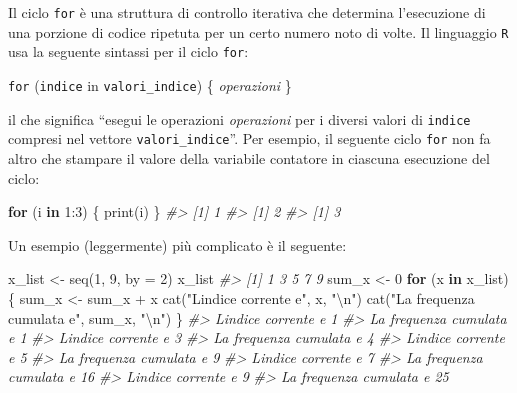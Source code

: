 \documentclass[
  11pt,
]{krantz}
\makeatletter
\newenvironment{Shaded}{\begin{snugshade}}{\end{snugshade}}
\newcommand{\AttributeTok}[1]{\textcolor[rgb]{0.61,0.61,0.61}{#1}}
\newcommand{\CommentTok}[1]{\textcolor[rgb]{0.37,0.37,0.37}{\textit{#1}}}
\newcommand{\ControlFlowTok}[1]{\textcolor[rgb]{0.27,0.27,0.27}{\textbf{#1}}}
\newcommand{\DecValTok}[1]{\textcolor[rgb]{0.06,0.06,0.06}{#1}}
\newcommand{\FunctionTok}[1]{\textcolor[rgb]{0,0,0}{#1}}
\newcommand{\NormalTok}[1]{#1}
\newcommand{\OtherTok}[1]{\textcolor[rgb]{0.37,0.37,0.37}{#1}}
\newcommand{\SpecialCharTok}[1]{\textcolor[rgb]{0,0,0}{#1}}
\newcommand{\StringTok}[1]{\textcolor[rgb]{0.5,0.5,0.5}{#1}}
\newenvironment{kframe}{%
\medskip{}
\setlength{\fboxsep}{.8em}
 \def\at@end@of@kframe{}%
 \ifinner\ifhmode%
  \def\at@end@of@kframe{\end{minipage}}%
  \begin{minipage}{\columnwidth}%
 \fi\fi%
 \def\FrameCommand##1{\hskip\@totalleftmargin \hskip-\fboxsep
 \colorbox{shadecolor}{##1}\hskip-\fboxsep
     \hskip-\linewidth \hskip-\@totalleftmargin \hskip\columnwidth}%
 \MakeFramed {\advance\hsize-\width
   \@totalleftmargin\z@ \linewidth\hsize
   \@setminipage}}%
 {\par\unskip\endMakeFramed%
 \at@end@of@kframe}
\renewenvironment{Shaded}{\begin{kframe}}{\end{kframe}}
\theoremstyle{definition}
\theoremstyle{definition}
\theoremstyle{definition}
\theoremstyle{definition}
\theoremstyle{remark}
\makeatother
\begin{document}
Il ciclo \texttt{for} è una struttura di controllo iterativa che determina l'esecuzione di una porzione di codice ripetuta per un certo numero noto di volte. Il linguaggio \texttt{R} usa la seguente sintassi per il ciclo \texttt{for}:

\texttt{for} (\texttt{indice} in \texttt{valori\_indice}) \{ \emph{operazioni} \}

il che significa ``esegui le operazioni \emph{operazioni} per i diversi valori di \texttt{indice} compresi nel vettore \texttt{valori\_indice}''. Per esempio, il seguente ciclo \texttt{for} non fa altro che stampare il valore della variabile contatore in ciascuna esecuzione del ciclo:

\begin{Shaded}
\begin{Highlighting}[]
\ControlFlowTok{for}\NormalTok{ (i }\ControlFlowTok{in} \DecValTok{1}\SpecialCharTok{:}\DecValTok{3}\NormalTok{) \{}
  \FunctionTok{print}\NormalTok{(i)}
\NormalTok{\}}
\CommentTok{\#\textgreater{} [1] 1}
\CommentTok{\#\textgreater{} [1] 2}
\CommentTok{\#\textgreater{} [1] 3}
\end{Highlighting}
\end{Shaded}

Un esempio (leggermente) più complicato è il seguente:

\begin{Shaded}
\begin{Highlighting}[]
\NormalTok{x\_list }\OtherTok{\textless{}{-}} \FunctionTok{seq}\NormalTok{(}\DecValTok{1}\NormalTok{, }\DecValTok{9}\NormalTok{, }\AttributeTok{by =} \DecValTok{2}\NormalTok{)}
\NormalTok{x\_list}
\CommentTok{\#\textgreater{} [1] 1 3 5 7 9}
\NormalTok{sum\_x }\OtherTok{\textless{}{-}} \DecValTok{0}
\ControlFlowTok{for}\NormalTok{ (x }\ControlFlowTok{in}\NormalTok{ x\_list) \{}
\NormalTok{  sum\_x }\OtherTok{\textless{}{-}}\NormalTok{ sum\_x }\SpecialCharTok{+}\NormalTok{ x}
  \FunctionTok{cat}\NormalTok{(}\StringTok{"L\textquotesingle{}indice corrente e\textquotesingle{}"}\NormalTok{, x, }\StringTok{"}\SpecialCharTok{\textbackslash{}n}\StringTok{"}\NormalTok{)}
  \FunctionTok{cat}\NormalTok{(}\StringTok{"La frequenza cumulata e\textquotesingle{}"}\NormalTok{, sum\_x, }\StringTok{"}\SpecialCharTok{\textbackslash{}n}\StringTok{"}\NormalTok{) }
\NormalTok{\}}
\CommentTok{\#\textgreater{} L\textquotesingle{}indice corrente e\textquotesingle{} 1 }
\CommentTok{\#\textgreater{} La frequenza cumulata e\textquotesingle{} 1 }
\CommentTok{\#\textgreater{} L\textquotesingle{}indice corrente e\textquotesingle{} 3 }
\CommentTok{\#\textgreater{} La frequenza cumulata e\textquotesingle{} 4 }
\CommentTok{\#\textgreater{} L\textquotesingle{}indice corrente e\textquotesingle{} 5 }
\CommentTok{\#\textgreater{} La frequenza cumulata e\textquotesingle{} 9 }
\CommentTok{\#\textgreater{} L\textquotesingle{}indice corrente e\textquotesingle{} 7 }
\CommentTok{\#\textgreater{} La frequenza cumulata e\textquotesingle{} 16 }
\CommentTok{\#\textgreater{} L\textquotesingle{}indice corrente e\textquotesingle{} 9 }
\CommentTok{\#\textgreater{} La frequenza cumulata e\textquotesingle{} 25}
\end{Highlighting}
\end{Shaded}
\end{document}
